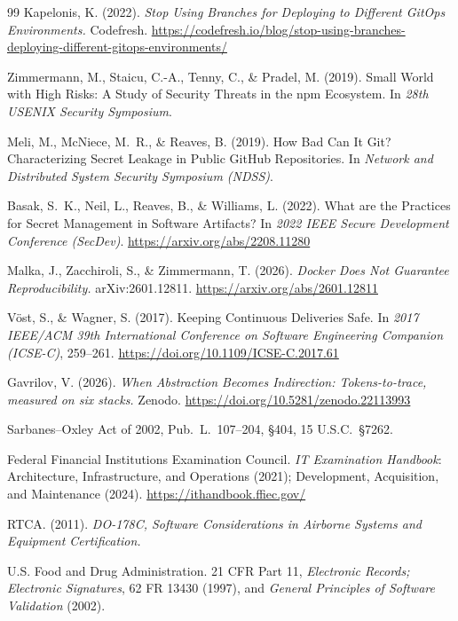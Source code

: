 \documentclass[11pt]{article}
\begin{document}
\begin{thebibliography}{99}
Kapelonis, K. (2022). \textit{Stop Using Branches for Deploying to Different GitOps Environments.} Codefresh. \url{https://codefresh.io/blog/stop-using-branches-deploying-different-gitops-environments/}

Zimmermann, M., Staicu, C.-A., Tenny, C., \& Pradel, M. (2019). Small World with High Risks: A Study of Security Threats in the npm Ecosystem. In \textit{28th USENIX Security Symposium}.

Meli, M., McNiece, M.~R., \& Reaves, B. (2019). How Bad Can It Git? Characterizing Secret Leakage in Public GitHub Repositories. In \textit{Network and Distributed System Security Symposium (NDSS)}.

Basak, S.~K., Neil, L., Reaves, B., \& Williams, L. (2022). What are the Practices for Secret Management in Software Artifacts? In \textit{2022 IEEE Secure Development Conference (SecDev)}. \url{https://arxiv.org/abs/2208.11280}

Malka, J., Zacchiroli, S., \& Zimmermann, T. (2026). \textit{Docker Does Not Guarantee Reproducibility.} arXiv:2601.12811. \url{https://arxiv.org/abs/2601.12811}

V\"ost, S., \& Wagner, S. (2017). Keeping Continuous Deliveries Safe. In \textit{2017 IEEE/ACM 39th International Conference on Software Engineering Companion (ICSE-C)}, 259--261. \url{https://doi.org/10.1109/ICSE-C.2017.61}

Gavrilov, V. (2026). \textit{When Abstraction Becomes Indirection: Tokens-to-trace, measured on six stacks.} Zenodo. \url{https://doi.org/10.5281/zenodo.22113993}

Sarbanes--Oxley Act of 2002, Pub.\ L.\ 107--204, \S404, 15 U.S.C.\ \S7262.

Federal Financial Institutions Examination Council. \textit{IT Examination Handbook}: Architecture, Infrastructure, and Operations (2021); Development, Acquisition, and Maintenance (2024). \url{https://ithandbook.ffiec.gov/}

RTCA. (2011). \textit{DO-178C, Software Considerations in Airborne Systems and Equipment Certification.}

U.S. Food and Drug Administration. 21 CFR Part 11, \textit{Electronic Records; Electronic Signatures}, 62 FR 13430 (1997), and \textit{General Principles of Software Validation} (2002).


\end{thebibliography}
\end{document}
